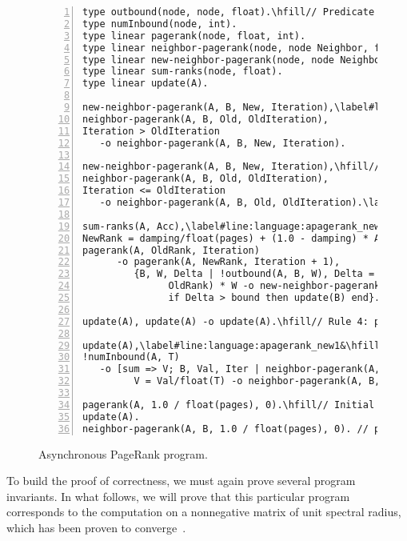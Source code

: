 \begin{figure}[h!]
\begin{Verbatim}[numbers=left,fontsize=\codesize,commandchars=\\\#\&]
type outbound(node, node, float).\hfill// Predicate declaration.
type numInbound(node, int).
type linear pagerank(node, float, int).
type linear neighbor-pagerank(node, node Neighbor, float Rank, int Iteration).
type linear new-neighbor-pagerank(node, node Neighbor, float Rank, int Iteration).
type linear sum-ranks(node, float).
type linear update(A).

new-neighbor-pagerank(A, B, New, Iteration),\label#line:language:apagerank_update1&\hfill// Rule 1: update neighbor value.
neighbor-pagerank(A, B, Old, OldIteration),
Iteration > OldIteration
   -o neighbor-pagerank(A, B, New, Iteration).

new-neighbor-pagerank(A, B, New, Iteration),\hfill// Rule 2: update neighbor value.
neighbor-pagerank(A, B, Old, OldIteration),
Iteration <= OldIteration
   -o neighbor-pagerank(A, B, Old, OldIteration).\label#line:language:apagerank_update2&

sum-ranks(A, Acc),\label#line:language:apagerank_new1&\hfill// Rule 3: propagate new pagerank.
NewRank = damping/float(pages) + (1.0 - damping) * Acc,
pagerank(A, OldRank, Iteration)
      -o pagerank(A, NewRank, Iteration + 1),
         {B, W, Delta | !outbound(A, B, W), Delta = fabs(NewRank -
               OldRank) * W -o new-neighbor-pagerank(B, A, NewRank, Iteration + 1),
               if Delta > bound then update(B) end}.\label#line:language:apagerank_new2&

update(A), update(A) -o update(A).\hfill// Rule 4: prune update facts.

update(A),\label#line:language:apagerank_new1&\hfill// Rule 5: start update process.
!numInbound(A, T)
   -o [sum => V; B, Val, Iter | neighbor-pagerank(A, B, Val, Iter),
         V = Val/float(T) -o neighbor-pagerank(A, B, Val, Iter) -> sum-ranks(A, V)].\label#line:language:apagerank_new2&

pagerank(A, 1.0 / float(pages), 0).\hfill// Initial facts.
update(A).
neighbor-pagerank(A, B, 1.0 / float(pages), 0). // pagerank of B is ...
\end{Verbatim}
\caption{Asynchronous PageRank program.}
\label{language:code:async_pagerank}
\end{figure}

To build the proof of correctness, we must again prove several program
invariants. In what follows, we will prove that this particular program
corresponds to the computation on a nonnegative matrix of unit spectral
radius, which has been proven to
converge~\cite{DBLP:journals/corr/abs-cs-0606047,
Lubachevsky:1986:CAA:4904.4801}.


